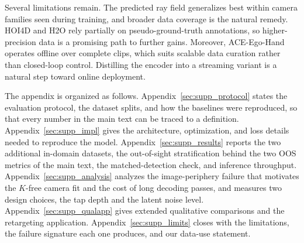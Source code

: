 \documentclass[10pt,twocolumn,letterpaper]{article}
\newcommand{\method}{ACE-Ego-Hand} %
\begin{document}
Several limitations remain. The predicted ray field generalizes best within camera families seen during training, and broader data coverage is the natural remedy. HOI4D and H2O rely partially on pseudo-ground-truth annotations, so higher-precision data is a promising path to further gains. Moreover, \method{} operates offline over complete clips, which suits scalable data curation rather than closed-loop control. Distilling the encoder into a streaming variant is a natural step toward online deployment. 

{
    \small
    \setlength{\bibsep}{0.5pt} %
    
    
}

\appendix
\renewcommand{\thetable}{S\arabic{table}}\setcounter{table}{0}
\renewcommand{\thefigure}{S\arabic{figure}}\setcounter{figure}{0}
\renewcommand{\theequation}{S\arabic{equation}}\setcounter{equation}{0}
\def\theHtable{S\arabic{table}}
\def\theHfigure{S\arabic{figure}}
\def\theHequation{S\arabic{equation}}
\maketitlesupplementary

The appendix is organized as follows. Appendix~\ref{sec:supp_protocol} states the evaluation protocol, the dataset splits, and how the baselines were reproduced, so that every number in the main text can be traced to a definition. Appendix~\ref{sec:supp_impl} gives the architecture, optimization, and loss details needed to reproduce the model. Appendix~\ref{sec:supp_results} reports the two additional in-domain datasets, the out-of-sight stratification behind the two OOS metrics of the main text, the matched-detection check, and inference throughput. Appendix~\ref{sec:supp_analysis} analyzes the image-periphery failure that motivates the $K$-free camera fit and the cost of long decoding passes, and measures two design choices, the tap depth and the latent noise level. Appendix~\ref{sec:supp_qualapp} gives extended qualitative comparisons and the retargeting application. Appendix~\ref{sec:supp_limits} closes with the limitations, the failure signature each one produces, and our data-use statement.
\end{document}
